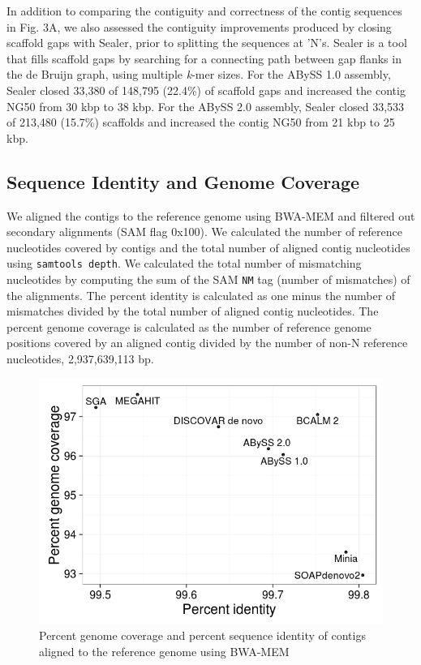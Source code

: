 \documentclass[
  12pt,
  oneside,
  openany]{book}
\begin{document}
\begin{appendices}
In addition to comparing the contiguity and correctness of the contig sequences in Fig. 3A, we also assessed the contiguity improvements produced by closing scaffold gaps with Sealer, prior to splitting the sequences at 'N's. Sealer is a tool that fills scaffold gaps by searching for a connecting path between gap flanks in the de Bruijn graph, using multiple \emph{k}-mer sizes. For the ABySS 1.0 assembly, Sealer closed 33,380 of 148,795 (22.4\%) of scaffold gaps and increased the contig NG50 from 30 kbp to 38 kbp. For the ABySS 2.0 assembly, Sealer closed 33,533 of 213,480 (15.7\%) scaffolds and increased the contig NG50 from 21 kbp to 25 kbp.

\hypertarget{sequence-identity-and-genome-coverage}{%
\subsection{Sequence Identity and Genome Coverage}\label{sequence-identity-and-genome-coverage}}

We aligned the contigs to the reference genome using BWA-MEM and filtered out secondary alignments (SAM flag 0x100). We calculated the number of reference nucleotides covered by contigs and the total number of aligned contig nucleotides using \texttt{samtools\ depth}. We calculated the total number of mismatching nucleotides by computing the sum of the SAM \texttt{NM} tag (number of mismatches) of the alignments. The percent identity is calculated as one minus the number of mismatches divided by the total number of aligned contig nucleotides. The percent genome coverage is calculated as the number of reference genome positions covered by an aligned contig divided by the number of non-N reference nucleotides, 2,937,639,113 bp.

\begin{figure}
\hypertarget{fig:cov}{%
\centering
\includegraphics{abyss2-appendix/coverage-identity.png}
\caption[Percent genome coverage and percent sequence identity of contigs aligned to the reference genome using BWA-MEM]{Percent genome coverage and percent sequence identity of contigs aligned to the reference genome using BWA-MEM}\label{fig:cov}
}
\end{figure}


\end{appendices}
\end{document}
